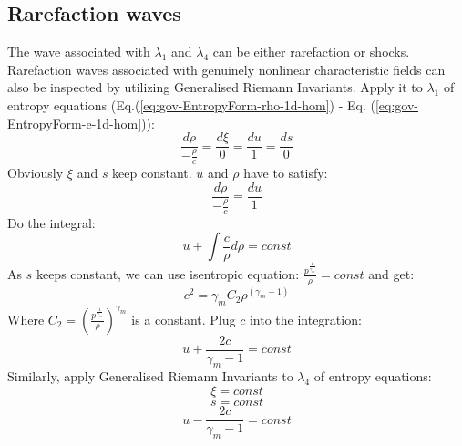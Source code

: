 \subsection{Rarefaction waves}
The wave associated with $\lambda_1$ and $\lambda_4$ can be either rarefaction or shocks.
Rarefaction waves associated with genuinely nonlinear characteristic fields can also be inspected by utilizing Generalised Riemann Invariants. Apply it to $\lambda_1$ of entropy equations (Eq.(\ref{eq:gov-EntropyForm-rho-1d-hom}) - Eq. (\ref{eq:gov-EntropyForm-e-1d-hom})): 
\begin{equation}
\frac{d \rho}{-\frac{\rho}{c}}=\frac{d \xi}{0} = \frac{d u}{1} = \frac{d s}{0}
\end{equation}
Obviously $\xi$ and $s$ keep constant. $u$ and $\rho$ have to satisfy: 
\begin{equation}
\frac{d \rho}{-\frac{\rho}{c}} = \frac{d u}{1}
\end{equation} 
Do the integral: 
\begin{equation}
u+\int \frac{c}{\rho} d\rho =const
\end{equation}
As $s$ keeps constant, we can use isentropic equation: $\frac{p^{\frac{1}{\gamma_m}}}{\rho}=const$ and get: 
\begin{equation}
c^2=\gamma_m C_2 \rho^{(\gamma_m -1)}
\end{equation}
Where $C_2 = \left(\frac{p^{\frac{1}{\gamma_m}}}{\rho}\right)^{\gamma_m}$ is a constant. Plug $c$ into the integration: 
\begin{equation}
u+\frac{2c}{\gamma_m -1} = const
\label{eq:RP-solution-rarefaction-u-lamda1}
\end{equation}
Similarly, apply Generalised Riemann Invariants to $\lambda_4$ of entropy equations:
\begin{equation}
\xi = const \label{eq:RP-solution-rarefaction-xi}
\end{equation}
\begin{equation}
s = const \label{eq:RP-solution-rarefaction-s}
\end{equation}
\begin{equation}
u-\frac{2c}{\gamma_m -1} = const 
\label{eq:RP-solution-rarefaction-u-lamda4}
\end{equation}

